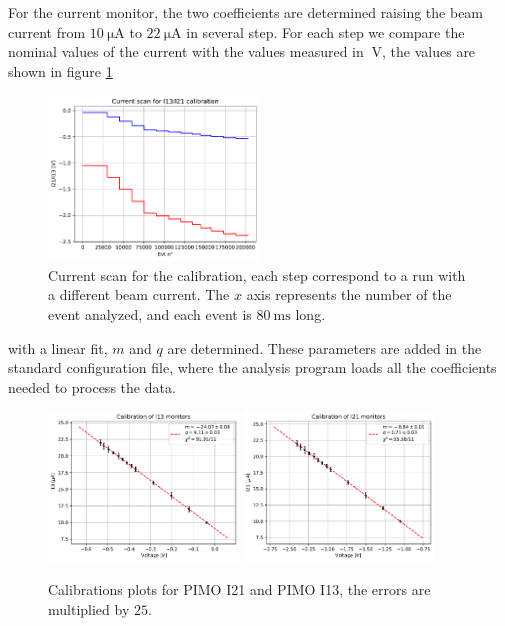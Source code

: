 For the current monitor, the two coefficients are determined raising the beam current from $\SI{10}{\micro \ampere}$ to $\SI{22}{\micro \ampere}$ in several step. For each step we compare the nominal values of the current with the values measured in $\SI{}{\volt}$, the values are shown in figure \ref{fig:ScanCurrent}

\begin{figure}[ht]
\centering
\includegraphics[width = 0.5\textwidth]{Analysis/Calibrations/ScanI21I13.pdf}
\caption{Current scan for the calibration, each step correspond to a run with a different beam current. The $x$ axis represents the number of the event analyzed, and each event is $\SI{80}{\milli \second}$ long.}
\label{fig:ScanCurrent}
\end{figure}

with a linear fit, $m$ and $q$ are determined. These parameters are added in the standard configuration file, where the analysis program loads all the coefficients needed to process the data.

\begin{figure}[hbtp]
\centering
\includegraphics[width = 0.45\textwidth]{Analysis/Calibrations/I13.pdf}
\includegraphics[width = 0.45\textwidth]{Analysis/Calibrations/I21.pdf} 
\caption{Calibrations plots for PIMO I21 and PIMO I13, the errors are multiplied by $25$.}
\label{fig:PimoCalib}
\end{figure}

